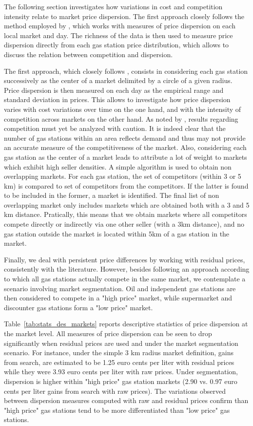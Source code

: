\documentclass[english]{article}
\begin{document}
The following section investigates how variations in cost and competition intensity relate to market price dispersion. The first approach closely follows the method employed by , which works with measures of price dispersion on each local market and day. The richness of the data is then used to measure price dispersion directly from each gas station price distribution, which allows to discuss the relation between competition and dispersion.

The first approach, which closely follows \cite{TAP11}, consists in considering each gas station successively as the center of a market delimited by a circle of a given radius. Price dispersion is then measured on each day as the empirical range and standard deviation in prices. This allows to investigate how price dispersion varies with cost variations over time on the one hand, and with the intensity of competition across markets on the other hand. As noted by \cite{TAP11}, results regarding competition must yet be analyzed with caution. It is indeed clear that the number of gas stations within an area reflects demand and thus may not provide an accurate measure of the competitiveness of the market. Also, considering each gas station as the center of a market leads to attribute a lot of weight to markets which exhibit high seller densities. A simple algorithm is used to obtain non overlapping markets.  For each gas station, the set of competitors (within 3 or 5 km) is compared to set of competitors from the competitors. If the latter is found to be included in the former, a market is identified. The final list of non overlapping market only includes markets which are obtained both with a 3 and 5 km distance. Pratically, this means that we obtain markets where all competitors compete directly or indirectly via one other seller (with a 3km distance), and no gas station outside the market is located within 5km of a gas station in the market.

Finally, we deal with persistent price differences by working with residual prices, consistently with the literature. However, besides following an approach according to which all gas stations actually compete in the same market, we contemplate a scenario involving market segmentation. Oil and independent gas stations are then considered to compete in a "high price" market, while supermarket and discounter gas stations form a "low price" market.

Table~\ref{tab:stats_des_markets} reports descriptive statistics of price dispersion at the market level. All measures of price dispersion can be seen to drop significantly when residual prices are used and under the market segmentation scenario. For instance, under the simple 3 km radius market definition, gains from search, are estimated to be 1.25 euro cents per liter with residual prices while they were 3.93 euro cents per liter with raw prices. Under segmentation, dispersion is higher within "high price" gas station markets (2.90 vs. 0.97 euro cents per liter gains from search with raw prices). The variations observed between dispersion measures computed with raw and residual prices confirm than "high price" gas stations tend to be more differentiated than "low price" gas stations.
\end{document}
